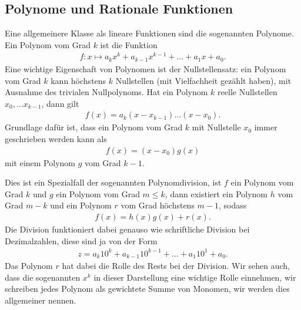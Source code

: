 \documentclass[letterpaper,10pt,english]{jupyterBook}
\begin{document}
\subsection{Polynome und Rationale Funktionen}
\label{\detokenize{vorkurs/funktionen:polynome-und-rationale-funktionen}}
Eine allgemeinere Klasse als lineare Funktionen sind die sogenannten Polynome. Ein Polynom vom Grad \(k\) ist die Funktion
\begin{equation*}
\begin{split} f:x\mapsto a_k x^k + a_{k-1}x^{k-1} + \ldots + a_1 x + a_0. \end{split}
\end{equation*}
Eine wichtige Eigenschaft von Polynomen ist der Nullstellensatz: ein Polynom vom Grad \(k\) kann höchstens \(k\) Nullstellen (mit Vielfachheit gezählt haben), mit Ausnahme des trivialen Nullpolynoms. Hat ein Polynom \(k\) reelle Nullstellen \(x_0, \ldots x_{k-1}\), dann gilt
\begin{equation*}
\begin{split} f(x) = a_k (x - x_{k-1}) \ldots (x-x_0). \end{split}
\end{equation*}
Grundlage dafür ist, dass ein Polynom vom Grad \(k\) mit Nullstelle \(x_0\) immer geschrieben werden kann als
\begin{equation*}
\begin{split} f(x) = (x-x_0) g(x) \end{split}
\end{equation*}
mit einem Polynom \(g\) vom Grad \(k-1\).

Dies ist ein Spezialfall der sogenannten Polynomdivision, ist \(f\) ein Polynom vom Grad \(k\) und \(g\) ein Polynom vom Grad \(m \leq k\), dann existiert ein Polynom \(h\) vom Grad \(m-k\) und ein Polynom \(r\) vom Grad höchstens \(m-1\), sodass
\begin{equation*}
\begin{split} f(x) = h(x) g(x) + r(x).\end{split}
\end{equation*}
Die Division funktioniert dabei genauso wie schriftliche Division bei Dezimalzahlen, diese sind ja von der Form
\begin{equation*}
\begin{split}z = a_k 10^k + a_{k-1} 10^{k-1} + \ldots + a_1 10^1 + a_0. \end{split}
\end{equation*}
Das Polynom \(r\) hat dabei die Rolle des Rests bei der Division.  Wir sehen auch, dass die sogenannten  \(x^k\) in dieser Darstellung eine wichtige Rolle einnehmen, wir schreiben jedes Polynom als gewichtete Summe von Monomen, wir werden dies allgemeiner  nennen.
\end{document}
